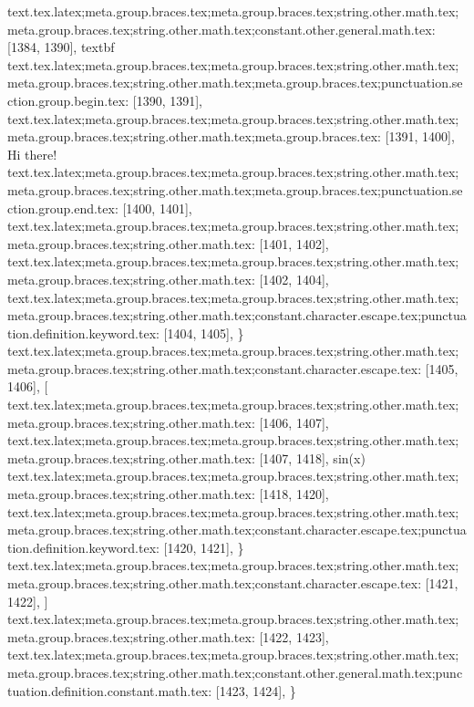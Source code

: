{{{{{{{{{{{{{{{{{{{{{{{{{{{{{{{{{{{text.tex.latex;meta.group.braces.tex;meta.group.braces.tex;string.other.math.tex;meta.group.braces.tex;string.other.math.tex;constant.other.general.math.tex: [1384, 1390], {textbf}
text.tex.latex;meta.group.braces.tex;meta.group.braces.tex;string.other.math.tex;meta.group.braces.tex;string.other.math.tex;meta.group.braces.tex;punctuation.section.group.begin.tex: [1390, 1391], {{}
text.tex.latex;meta.group.braces.tex;meta.group.braces.tex;string.other.math.tex;meta.group.braces.tex;string.other.math.tex;meta.group.braces.tex: [1391, 1400], {Hi there!}
text.tex.latex;meta.group.braces.tex;meta.group.braces.tex;string.other.math.tex;meta.group.braces.tex;string.other.math.tex;meta.group.braces.tex;punctuation.section.group.end.tex: [1400, 1401], {}}
text.tex.latex;meta.group.braces.tex;meta.group.braces.tex;string.other.math.tex;meta.group.braces.tex;string.other.math.tex: [1401, 1402], {
}
text.tex.latex;meta.group.braces.tex;meta.group.braces.tex;string.other.math.tex;meta.group.braces.tex;string.other.math.tex: [1402, 1404], {  }
text.tex.latex;meta.group.braces.tex;meta.group.braces.tex;string.other.math.tex;meta.group.braces.tex;string.other.math.tex;constant.character.escape.tex;punctuation.definition.keyword.tex: [1404, 1405], {\}
text.tex.latex;meta.group.braces.tex;meta.group.braces.tex;string.other.math.tex;meta.group.braces.tex;string.other.math.tex;constant.character.escape.tex: [1405, 1406], {[}
text.tex.latex;meta.group.braces.tex;meta.group.braces.tex;string.other.math.tex;meta.group.braces.tex;string.other.math.tex: [1406, 1407], {
}
text.tex.latex;meta.group.braces.tex;meta.group.braces.tex;string.other.math.tex;meta.group.braces.tex;string.other.math.tex: [1407, 1418], {    sin(x)
}
text.tex.latex;meta.group.braces.tex;meta.group.braces.tex;string.other.math.tex;meta.group.braces.tex;string.other.math.tex: [1418, 1420], {  }
text.tex.latex;meta.group.braces.tex;meta.group.braces.tex;string.other.math.tex;meta.group.braces.tex;string.other.math.tex;constant.character.escape.tex;punctuation.definition.keyword.tex: [1420, 1421], {\}
text.tex.latex;meta.group.braces.tex;meta.group.braces.tex;string.other.math.tex;meta.group.braces.tex;string.other.math.tex;constant.character.escape.tex: [1421, 1422], {]}
text.tex.latex;meta.group.braces.tex;meta.group.braces.tex;string.other.math.tex;meta.group.braces.tex;string.other.math.tex: [1422, 1423], {
}
text.tex.latex;meta.group.braces.tex;meta.group.braces.tex;string.other.math.tex;meta.group.braces.tex;string.other.math.tex;constant.other.general.math.tex;punctuation.definition.constant.math.tex: [1423, 1424], {\}
}}}}}}}}}}}}}}}}}}}}}}}}}}}}}}}}}}}}}}
